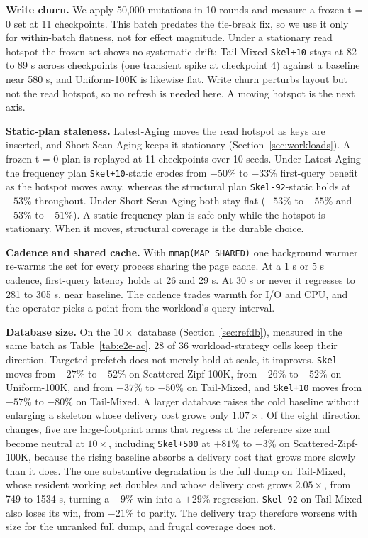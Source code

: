 \documentclass[sigconf, nonacm]{acmart}
\begin{document}
\textbf{Write churn.} We apply 50,000 mutations in 10 rounds and measure a frozen t = 0 set at 11 checkpoints. This batch predates the tie-break fix, so we use it only for within-batch flatness, not for effect magnitude. Under a stationary read hotspot the frozen set shows no systematic drift: Tail-Mixed \texttt{Skel+10} stays at 82 to 89 \textmu s across checkpoints (one transient spike at checkpoint 4) against a baseline near 580 \textmu s, and Uniform-100K is likewise flat. Write churn perturbs layout but not the read hotspot, so no refresh is needed here. A moving hotspot is the next axis.

\textbf{Static-plan staleness.} Latest-Aging moves the read hotspot as keys are inserted, and Short-Scan Aging keeps it stationary (Section~\ref{sec:workloads}). A frozen t = 0 plan is replayed at 11 checkpoints over 10 seeds. Under Latest-Aging the frequency plan \texttt{Skel+10}-static erodes from $-50\%$ to $-33\%$ first-query benefit as the hotspot moves away, whereas the structural plan \texttt{Skel-92}-static holds at $-53\%$ throughout. Under Short-Scan Aging both stay flat ($-53\%$ to $-55\%$ and $-53\%$ to $-51\%$). A static frequency plan is safe only while the hotspot is stationary. When it moves, structural coverage is the durable choice.

\textbf{Cadence and shared cache.} With \texttt{mmap(MAP\_SHARED)} one background warmer re-warms the set for every process sharing the page cache. At a 1 s or 5 s cadence, first-query latency holds at 26 and 29 \textmu s. At 30 s or never it regresses to 281 to 305 \textmu s, near baseline. The cadence trades warmth for I/O and CPU, and the operator picks a point from the workload's query interval.

\textbf{Database size.} On the $10\times$ database (Section~\ref{sec:refdb}), measured in the
same batch as Table~\ref{tab:e2e-ac}, 28 of 36 workload-strategy cells keep their direction.
Targeted prefetch does not merely hold at scale, it improves. \texttt{Skel} moves from $-27\%$
to $-52\%$ on Scattered-Zipf-100K, from $-26\%$ to $-52\%$ on Uniform-100K, and from $-37\%$ to
$-50\%$ on Tail-Mixed, and \texttt{Skel+10} moves from $-57\%$ to $-80\%$ on Tail-Mixed. A
larger database raises the cold baseline without enlarging a skeleton whose delivery cost grows
only $1.07\times$. Of the eight direction changes, five are large-footprint arms that regress at
the reference size and become neutral at $10\times$, including \texttt{Skel+500} at $+81\%$ to
$-3\%$ on Scattered-Zipf-100K, because the rising baseline absorbs a delivery cost that grows
more slowly than it does. The one substantive degradation is the full dump on Tail-Mixed, whose
resident working set doubles and whose delivery cost grows $2.05\times$, from 749 to 1534
\textmu s, turning a $-9\%$ win into a $+29\%$ regression. \texttt{Skel-92} on Tail-Mixed also
loses its win, from $-21\%$ to parity. The delivery trap therefore worsens with size for the
unranked full dump, and frugal coverage does not.
\end{document}
